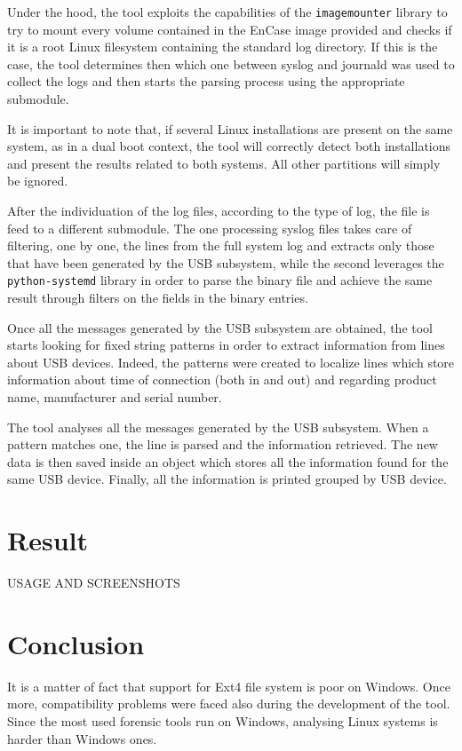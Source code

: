 \documentclass[a4paper]{article}
\begin{document}
Under the hood, the tool exploits the capabilities of the \texttt{imagemounter}
library to try to mount every volume contained in the EnCase image provided and
checks if it is a root Linux filesystem containing the standard log directory.
If this is the case, the tool determines then which one between syslog and
journald was used to collect the logs and then starts the parsing process using
the appropriate submodule.

It is important to note that, if several Linux installations are present on the
same system, as in a dual boot context, the tool will correctly detect both
installations and present the results related to both systems. All other
partitions will simply be ignored.

After the individuation of the log files, according to the type of log, the
file is feed to a different submodule. The one processing syslog files takes
care of filtering, one by one, the lines from the full system log and extracts
only those that have been generated by the USB subsystem, while the second
leverages the \texttt{python-systemd} library in order to parse the binary file
and achieve the same result through filters on the fields in the binary
entries.

Once all the messages generated by the USB subsystem are obtained, the tool
starts looking for fixed string patterns in order to extract information from
lines about USB devices. Indeed, the patterns were created to localize lines
which store information about time of connection (both in and out) and
regarding product name, manufacturer and serial number.

The tool analyses all the messages generated by the USB subsystem. When a
pattern matches one, the line is parsed and the information retrieved. The new
data is then saved inside an object which stores all the information found for
the same USB device. Finally, all the information is printed grouped by USB
device.

\section{Result}
\label{sec:result}

USAGE AND SCREENSHOTS

\section{Conclusion}
\label{sec:concl}
It is a matter of fact that support for Ext4 file system is poor on Windows.
Once more, compatibility problems were faced also during the development of the
tool. Since the most used forensic tools run on Windows, analysing Linux
systems is harder than Windows ones.
\end{document}
